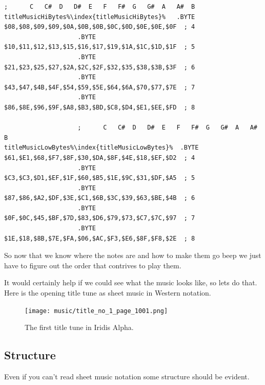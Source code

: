 \begin{lstlisting}[escapechar=\%,caption=The lookup table for all of the notes used in the theme music. The two lowest available octaves\index{octaves} are not
used by the game. To see this for yourself\, compare the first entry in \icode{titleMusicHiBytes\index{titleMusicHiBytes}}/\icode{titleMusicLowBytes\index{titleMusicLowBytes}} (\$08 and \$61\,
giving \$0861) with the entry highlighted in red in the previous table.,basicstyle=\tiny]
                    ;      C   C#  D   D#  E   F   F#  G   G#  A   A#  B
titleMusicHiBytes%\index{titleMusicHiBytes}%   .BYTE $08,$08,$09,$09,$0A,$0B,$0B,$0C,$0D,$0E,$0E,$0F  ; 4
                    .BYTE $10,$11,$12,$13,$15,$16,$17,$19,$1A,$1C,$1D,$1F  ; 5
                    .BYTE $21,$23,$25,$27,$2A,$2C,$2F,$32,$35,$38,$3B,$3F  ; 6
                    .BYTE $43,$47,$4B,$4F,$54,$59,$5E,$64,$6A,$70,$77,$7E  ; 7
                    .BYTE $86,$8E,$96,$9F,$A8,$B3,$BD,$C8,$D4,$E1,$EE,$FD  ; 8

                    ;      C   C#  D   D#  E   F   F#  G   G#  A   A#  B
titleMusicLowBytes%\index{titleMusicLowBytes}%  .BYTE $61,$E1,$68,$F7,$8F,$30,$DA,$8F,$4E,$18,$EF,$D2  ; 4
                    .BYTE $C3,$C3,$D1,$EF,$1F,$60,$B5,$1E,$9C,$31,$DF,$A5  ; 5
                    .BYTE $87,$86,$A2,$DF,$3E,$C1,$6B,$3C,$39,$63,$BE,$4B  ; 6
                    .BYTE $0F,$0C,$45,$BF,$7D,$83,$D6,$79,$73,$C7,$7C,$97  ; 7
                    .BYTE $1E,$18,$8B,$7E,$FA,$06,$AC,$F3,$E6,$8F,$F8,$2E  ; 8
\end{lstlisting}

So now that we know where the notes are and how to make them go beep we just have to figure out the order that 
contrives to play them.

It would certainly help if we could see what the music looks like, so lets do that. Here is the opening title tune as sheet
music in Western notation.

\begin{figure}[H]
{
  \begin{adjustbox}{width=11cm,center}
  \texttt{[image: music/title\_no\_1\_page\_1001.png]}%
    \end{adjustbox}
}\caption[]{The first title tune in Iridis Alpha.}
\end{figure}

\subsection{Structure}
Even if you can't read sheet music notation some structure should be evident.

